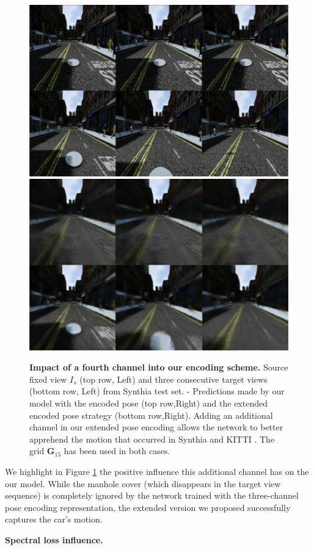 \begin{figure}[htp]

\begin{center}
\includegraphics[width=.45\textwidth]{images/epipolarnvs/ablationSynthia.png} \hfill
\includegraphics[width=.45\textwidth]{images/epipolarnvs/ablationSynthia2.png}
\end{center}
\caption{\textbf{Impact of a fourth channel into our encoding scheme.} Source fixed view $I_s$ (top row, Left) and three consecutive target views (bottom row, Left) from Synthia \cite{ros2016synthia} test set. - Predictions made by our model with the encoded pose (top row,Right) and the extended encoded pose strategy (bottom row,Right). Adding an additional channel in our extended pose encoding allows the network to better apprehend the motion that occurred in Synthia \cite{ros2016synthia} and KITTI \cite{geiger2012we}. The grid $\textbf{G}_{15}$ has been used in both cases.}
\label{fig:ablaSynthia}
\end{figure}

We highlight in Figure \ref{fig:ablaSynthia} the positive influence this additional channel has on the our model. While the manhole cover (which disappears in the target view sequence) is completely  ignored by the network trained with the three-channel pose encoding representation, the extended version we proposed successfully captures the car's motion.\newline 

\textbf{Spectral loss influence.}


